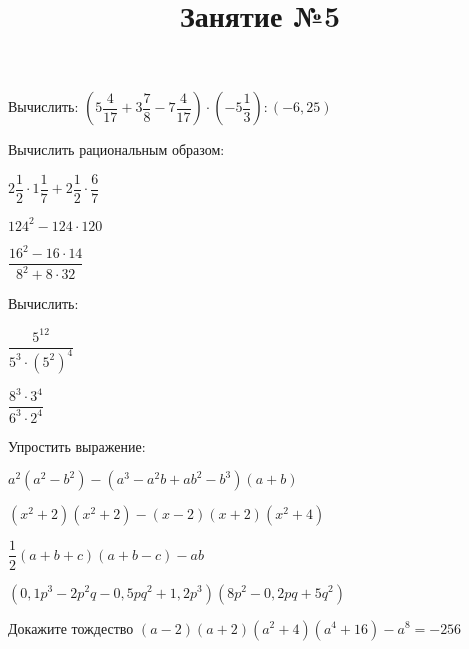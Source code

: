 \begin{listofex}
	\item Вычислить: \( \left( 5\dfrac{4}{17}+3\dfrac{7}{8}-7\dfrac{4}{17} \right)\cdot\left( -5\dfrac{1}{3} \right):(-6,25) \)
	\item Вычислить рациональным образом:
	\begin{enumcols}[itemcolumns=3]
		\item \( 2\dfrac{1}{2}\cdot1\dfrac{1}{7}+2\dfrac{1}{2}\cdot\dfrac{6}{7} \)
		\item \( 124^2-124\cdot120 \)
		\item \( \dfrac{16^2-16\cdot14}{8^2+8\cdot32} \)
	\end{enumcols}
	\item Вычислить:
	\begin{enumcols}[itemcolumns=2]
		\item \( \dfrac{5^{12}}{5^3\cdot(5^2)^4} \)
		\item \( \dfrac{8^3\cdot3^4}{6^3\cdot2^4} \)
	\end{enumcols}
	\item Упростить выражение:
	\begin{enumcols}[itemcolumns=1]
		\item \( a^2(a^2-b^2)-(a^3-a^2b+ab^2-b^3)(a+b) \)
		\item \( (x^2+2)(x^2+2)-(x-2)(x+2)(x^2+4) \)
		\item \( \dfrac{1}{2}(a+b+c)(a+b-c)-ab \)
		\item \( (0,1p^3-2p^2q-0,5pq^2+1,2p^3)(8p^2-0,2pq+5q^2) \)
	\end{enumcols}
	\item Докажите тождество \( (a-2)(a+2)(a^2+4)(a^4+16)-a^8=-256 \)
	
\end{listofex}
\newpage
\title{Занятие №5}
